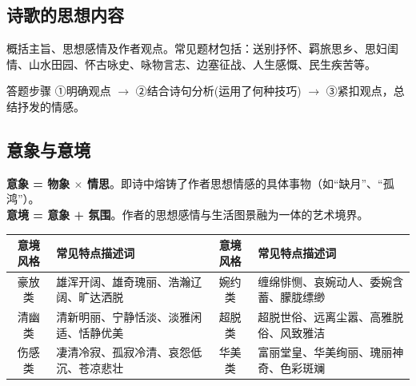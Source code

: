 \documentclass[11pt, a4paper]{ctexart}
\begin{document}
\subsection{诗歌的思想内容}
概括主旨、思想感情及作者观点。常见题材包括：送别抒怀、羁旅思乡、思妇闺情、山水田园、怀古咏史、咏物言志、边塞征战、人生感慨、民生疾苦等。

\begin{tipsbox}{答题步骤}
①明确观点 $\rightarrow$ ②结合诗句分析(运用了何种技巧) $\rightarrow$ ③紧扣观点，总结抒发的情感。
\end{tipsbox}

\subsection{意象与意境}
\textbf{意象 = 物象 $\times$ 情思}。即诗中熔铸了作者思想情感的具体事物（如“缺月”、“孤鸿”）。\\
\textbf{意境 = 意象 + 氛围}。作者的思想感情与生活图景融为一体的艺术境界。

\begin{table}[htbp]
\centering\small
\renewcommand{\arraystretch}{1.15}
\begin{tabularx}{\textwidth}{|c|X|c|X|}
\hline
\textbf{意境风格} & \textbf{常见特点描述词} & \textbf{意境风格} & \textbf{常见特点描述词} \\
\hline
豪放类 & 雄浑开阔、雄奇瑰丽、浩瀚辽阔、旷达洒脱 & 婉约类 & 缠绵悱恻、哀婉动人、委婉含蓄、朦胧缥缈 \\
\hline
清幽类 & 清新明丽、宁静恬淡、淡雅闲适、恬静优美 & 超脱类 & 超脱世俗、远离尘嚣、高雅脱俗、风致雅洁 \\
\hline
伤感类 & 凄清冷寂、孤寂冷清、哀怨低沉、苍凉悲壮 & 华美类 & 富丽堂皇、华美绚丽、瑰丽神奇、色彩斑斓 \\
\hline
\end{tabularx}
\end{table}
\end{document}
